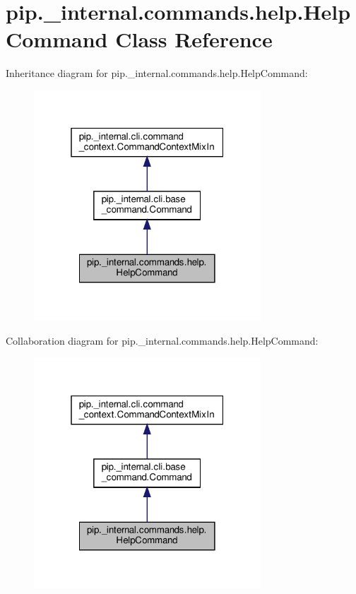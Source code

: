 \hypertarget{classpip_1_1__internal_1_1commands_1_1help_1_1HelpCommand}{}\section{pip.\+\_\+internal.\+commands.\+help.\+Help\+Command Class Reference}
\label{classpip_1_1__internal_1_1commands_1_1help_1_1HelpCommand}


Inheritance diagram for pip.\+\_\+internal.\+commands.\+help.\+Help\+Command\+:
\nopagebreak
\begin{figure}[H]
\begin{center}
\leavevmode
\includegraphics[width=241pt]{classpip_1_1__internal_1_1commands_1_1help_1_1HelpCommand__inherit__graph}
\end{center}
\end{figure}


Collaboration diagram for pip.\+\_\+internal.\+commands.\+help.\+Help\+Command\+:
\nopagebreak
\begin{figure}[H]
\begin{center}
\leavevmode
\includegraphics[width=241pt]{classpip_1_1__internal_1_1commands_1_1help_1_1HelpCommand__coll__graph}
\end{center}
\end{figure}
